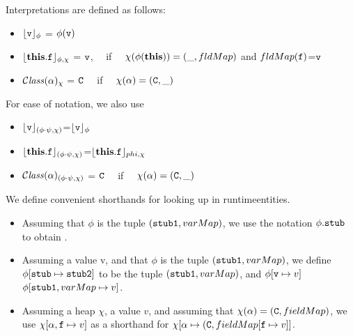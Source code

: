 \begin{definition}[Interpretations]
Interpretations are defined as follows:

\begin{itemize}
\item 
${\lfloor{ {{\mbox{\tt{v}}}}}\rfloor_{\phi}} $ = $\phi({\mbox{\tt{v}}})$  
\item
${\lfloor{ {{\bf{{this}}}.{\mbox{\tt{f}}}}}\rfloor_{\phi,\chi}} $ =  ${\mbox{\tt{v}}}$, \ \ if \ \ $\chi(\phi({\bf{{this}}}))=(\_, fldMap)$ and $fldMap({\mbox{\tt{f}}})$=${\mbox{\tt{v}}}$ 
\item
${\mathcal C}{\mathit{lass}}(\alpha)_{\chi} $ = ${\mbox{\tt{C}}}$ \ \ if \ \ $\chi(\alpha)=({\mbox{\tt{C}}},\_)$ 

\end{itemize}

\noindent
For ease of notation, we also use
\begin{itemize}
\item
${\lfloor{ {{\mbox{\tt{v}}}}}\rfloor_{(\phi\cdot\psi,\chi)}} $=${\lfloor{ {{\mbox{\tt{v}}}}}\rfloor_{\phi}} $
\item
${\lfloor{ {{\bf{{this}}}.{\mbox{\tt{f}}}}}\rfloor_{(\phi\cdot\psi,\chi)}} $=${\lfloor{ {{\bf{{this}}}.{\mbox{\tt{f}}}}}\rfloor_{phi,\chi}} $
\item
${\mathcal C}{\mathit{lass}}(\alpha)_{(\phi\cdot\psi,\chi)} $ = ${\mbox{\tt{C}}}$ \ \ if \ \ $\chi(\alpha)=({\mbox{\tt{C}}},\_)$ 
\end{itemize}

\end{definition}


\begin{definition}
We define convenient shorthands for looking up in  runtimeentities. 
\begin{itemize}
\item
Assuming that $\phi$ is the tuple  $({\mbox{\tt{stub1}}}, varMap)$, we use the notation  $\phi.{\mbox{\tt{stub}}}$ to obtain .
\item
Assuming a value v, and that $\phi$ is the tuple  $({\mbox{\tt{stub1}}}, varMap)$, we define $\phi[{\mbox{\tt{stub}}}\mapsto{\mbox{\tt{stub2}}}]$ to be the tuple   
$({\mbox{\tt{stub1}}}, varMap)$, and   $\phi[{\mbox{\tt{v}}} \mapsto v]$    $\phi[{\mbox{\tt{stub1}}}, varMap\mapsto v]$.
\item
Assuming a heap $\chi$, a value $v$, and assuming that $\chi(\alpha)=({\mbox{\tt{C}}}, fieldMap)$,
we use $\chi[\alpha,{\mbox{\tt{f}}} \mapsto v]$ as a shorthand for $\chi[\alpha \mapsto ({\mbox{\tt{C}}}, fieldMap[{\mbox{\tt{f}}} \mapsto v]]$.
\end{itemize}

\end{definition}


